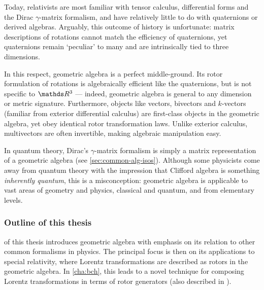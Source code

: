 Today, relativists are most familiar with tensor calculus, differential forms and the Dirac $γ$-matrix formalism, and have relatively little to do with quaternions or derived algebras.
Arguably, this outcome of history is unfortunate: matrix descriptions of rotations cannot match the efficiency of quaternions, yet quaternions remain `peculiar' to many and are intrinsically tied to three dimensions.

In this respect, geometric algebra is a perfect middle-ground.
Its rotor formulation of rotations is algebraically efficient like the quaternions, but is not specific to $\RR^3$ --- indeed, geometric algebra is general to any dimension or metric signature.
Furthermore, objects like vectors, bivectors and $k$-vectors (familiar from exterior differential calculus) are first-class objects in the geometric algebra, yet obey identical rotor transformation laws.
Unlike exterior calculus, multivectors are often invertible, making algebraic manipulation easy.

In quantum theory, Dirac's $γ$-matrix formalism is simply a matrix representation of a geometric algebra (see \cref{sec:common-alg-isos}).
Although some physicists come away from quantum theory with the impression that Clifford algebra is something \emph{inherently quantum}, this is a misconception: geometric algebra is applicable to vast areas of geometry and physics, classical and quantum, and from elementary levels.


\subsubsection{Outline of this thesis}


 of this thesis introduces geometric algebra with emphasis on its relation to other common formalisms in physics.
The principal focus is then on its applications to special relativity, where Lorentz transformations are described as rotors in the geometric algebra.
In \cref{cha:bch}, this leads to a novel technique for composing Lorentz transformations in terms of rotor generators (also described in \cite{wilson2021ga-bch}).

